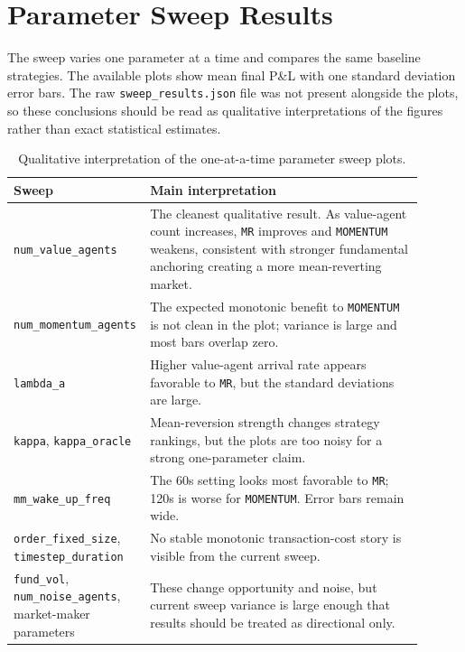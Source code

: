 \documentclass[11pt]{article}
\begin{document}
\section{Parameter Sweep Results}

The sweep varies one parameter at a time and compares the same baseline
strategies. The available plots show mean final P\&L with one standard deviation
error bars. The raw \texttt{sweep\_results.json} file was not present alongside
the plots, so these conclusions should be read as qualitative interpretations of
the figures rather than exact statistical estimates.

\begin{table}[H]
\centering
\small
\begin{tabular}{p{0.24\linewidth}p{0.66\linewidth}}
\toprule
Sweep & Main interpretation \\
\midrule
\texttt{num\_value\_agents} &
The cleanest qualitative result. As value-agent count increases, \texttt{MR}
improves and \texttt{MOMENTUM} weakens, consistent with stronger fundamental
anchoring creating a more mean-reverting market. \\
\texttt{num\_momentum\_agents} &
The expected monotonic benefit to \texttt{MOMENTUM} is not clean in the plot;
variance is large and most bars overlap zero. \\
\texttt{lambda\_a} &
Higher value-agent arrival rate appears favorable to \texttt{MR}, but the
standard deviations are large. \\
\texttt{kappa}, \texttt{kappa\_oracle} &
Mean-reversion strength changes strategy rankings, but the plots are too noisy
for a strong one-parameter claim. \\
\texttt{mm\_wake\_up\_freq} &
The 60s setting looks most favorable to \texttt{MR}; 120s is worse for
\texttt{MOMENTUM}. Error bars remain wide. \\
\texttt{order\_fixed\_size}, \texttt{timestep\_duration} &
No stable monotonic transaction-cost story is visible from the current sweep. \\
\texttt{fund\_vol}, \texttt{num\_noise\_agents}, market-maker parameters &
These change opportunity and noise, but current sweep variance is large enough
that results should be treated as directional only. \\
\bottomrule
\end{tabular}
\caption{Qualitative interpretation of the one-at-a-time parameter sweep plots.}
\label{tab:sweep-interpretation}
\end{table}
\end{document}
